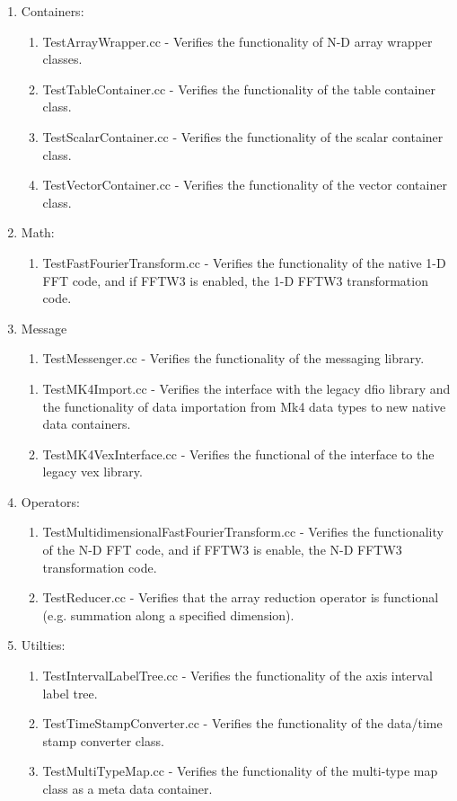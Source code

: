 \begin{enumerate}
 \item Containers:
 \begin{enumerate}
      \item  TestArrayWrapper.cc  - Verifies the functionality of N-D array wrapper classes.
      \item  TestTableContainer.cc - Verifies the functionality of the table container class.
      \item  TestScalarContainer.cc  - Verifies the functionality of the scalar container class.
      \item TestVectorContainer.cc - Verifies the functionality of the vector container class.
\end{enumerate}
    \item Math:        
\begin{enumerate}
 \item     TestFastFourierTransform.cc - Verifies the functionality of the native 1-D FFT code, and if FFTW3 is enabled, the 1-D FFTW3 transformation code.
\end{enumerate}
\item Message
\begin{enumerate}
 \item TestMessenger.cc - Verifies the functionality of the messaging library.
\end{enumerate}
\begin{enumerate}
 \item  TestMK4Import.cc - Verifies the interface with the legacy dfio library and the functionality of data importation from Mk4 data types to new native data containers.
 \item TestMK4VexInterface.cc - Verifies the functional of the interface to the legacy vex library.
\end{enumerate}
\item Operators:
\begin{enumerate}
 \item TestMultidimensionalFastFourierTransform.cc  - Verifies the functionality of the N-D FFT code, and if FFTW3 is enable, the N-D FFTW3 transformation code.
 \item TestReducer.cc - Verifies that the array reduction operator is functional (e.g. summation along a specified dimension).
\end{enumerate}
\item Utilties:
 \begin{enumerate}
    \item TestIntervalLabelTree.cc - Verifies the functionality of the axis interval label tree.
    \item TestTimeStampConverter.cc - Verifies the functionality of the data/time stamp converter class.
    \item TestMultiTypeMap.cc - Verifies the functionality of the multi-type map class as a meta data container.
 \end{enumerate}
\end{enumerate}




